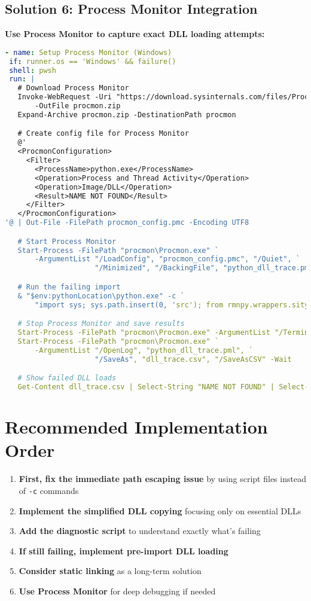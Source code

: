 \documentclass[11pt]{article}
\begin{document}
\subsection{Solution 6: Process Monitor Integration}

\textbf{Use Process Monitor to capture exact DLL loading attempts:}

\begin{lstlisting}[language=yaml]
- name: Setup Process Monitor (Windows)
 if: runner.os == 'Windows' && failure()
 shell: pwsh
 run: |
   # Download Process Monitor
   Invoke-WebRequest -Uri "https://download.sysinternals.com/files/ProcessMonitor.zip" `
       -OutFile procmon.zip
   Expand-Archive procmon.zip -DestinationPath procmon

   # Create config file for Process Monitor
   @'
   <ProcmonConfiguration>
     <Filter>
       <ProcessName>python.exe</ProcessName>
       <Operation>Process and Thread Activity</Operation>
       <Operation>Image/DLL</Operation>
       <Result>NAME NOT FOUND</Result>
     </Filter>
   </ProcmonConfiguration>
'@ | Out-File -FilePath procmon_config.pmc -Encoding UTF8

   # Start Process Monitor
   Start-Process -FilePath "procmon\Procmon.exe" `
       -ArgumentList "/LoadConfig", "procmon_config.pmc", "/Quiet", `
                     "/Minimized", "/BackingFile", "python_dll_trace.pml"

   # Run the failing import
   & "$env:pythonLocation\python.exe" -c `
       "import sys; sys.path.insert(0, 'src'); from rmnpy.wrappers.sitypes import Dimensionality"

   # Stop Process Monitor and save results
   Start-Process -FilePath "procmon\Procmon.exe" -ArgumentList "/Terminate" -Wait
   Start-Process -FilePath "procmon\Procmon.exe" `
       -ArgumentList "/OpenLog", "python_dll_trace.pml", `
                     "/SaveAs", "dll_trace.csv", "/SaveAsCSV" -Wait

   # Show failed DLL loads
   Get-Content dll_trace.csv | Select-String "NAME NOT FOUND" | Select-Object -First 10
\end{lstlisting}

\section{Recommended Implementation Order}

\begin{enumerate}
   \item \textbf{First, fix the immediate path escaping issue} by using script files instead of \texttt{-c} commands
   \item \textbf{Implement the simplified DLL copying} focusing only on essential DLLs
   \item \textbf{Add the diagnostic script} to understand exactly what's failing
   \item \textbf{If still failing, implement pre-import DLL loading}
   \item \textbf{Consider static linking} as a long-term solution
   \item \textbf{Use Process Monitor} for deep debugging if needed
\end{enumerate}
\end{document}
